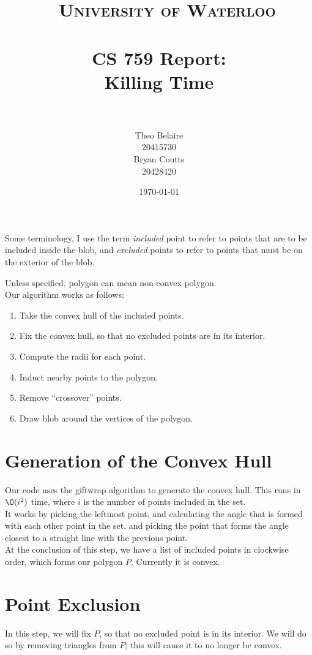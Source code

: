 \documentclass[paper=a4, fontsize=11pt]{scrartcl} %
\title{\
    \normalfont\normalsize
    \textsc{University of Waterloo} \\ [25pt] %
    \horrule{0.5pt} \\[0.4cm] %
    \huge CS 759 Report:\\
    Killing Time \\
    \horrule{2pt} \\[0.5cm] %
}
\author{Theo Belaire \\ 20415730 \\ Bryan Coutts \\ 20428420} %
\date{\normalsize\today} %
\numberwithin{equation}{section} %
\numberwithin{figure}{section} %
\numberwithin{table}{section} %
\begin{document}
\maketitle %


Some terminology, I use the term \textit{included} point to refer to points
that are to be included inside the blob, and \textit{excluded} points to refer
to points that must be on the exterior of the blob.

Unless specified, polygon can mean non-convex polygon. \\

Our algorithm works as follows:
\begin{enumerate}
\item Take the convex hull of the included points.
\item Fix the convex hull, so that no excluded points are in its interior.
\item Compute the radii for each point.
\item Induct nearby points to the polygon. 
\item Remove ``crossover'' points.
\item Draw blob around the vertices of the polygon.
\end{enumerate}


\section{Generation of the Convex Hull}
Our code uses the giftwrap algorithm to generate the convex hull.
This runs in $\O(i^2)$ time, where $i$ is the number of points included in the
set. \\

It works by picking the leftmost point, and calculating the angle that is
formed with each other point in the set, and picking the point that forms
the angle closest to a straight line with the previous point. \\

At the conclusion of this step, we have a list of included points in clockwise
order, which forms our polygon $P$. Currently it is convex.

\section{Point Exclusion}
In this step, we will fix $P$, so that no excluded point is in its interior. We
will do so by removing triangles from $P$; this will cause it to no longer be
convex. \\
\end{document}
